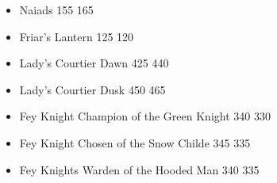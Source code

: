 \begin{multicols}{2}
\begin{itemize}
	\item Naiads 155 \costup{} 165
	\item Friar's Lantern 125 \costdown{} 120
	\item Lady's Courtier Dawn 425 \costup{} 440
	\item Lady's Courtier Dusk 450 \costup{} 465
	\item Fey Knight Champion of the Green Knight 340 \costdown{} 330
	\item Fey Knight Chosen of the Snow Childe 345 \costdown{} 335
	\item Fey Knights Warden of the Hooded Man 340 \costdown{} 335
\end{itemize}
\end{multicols}

%
